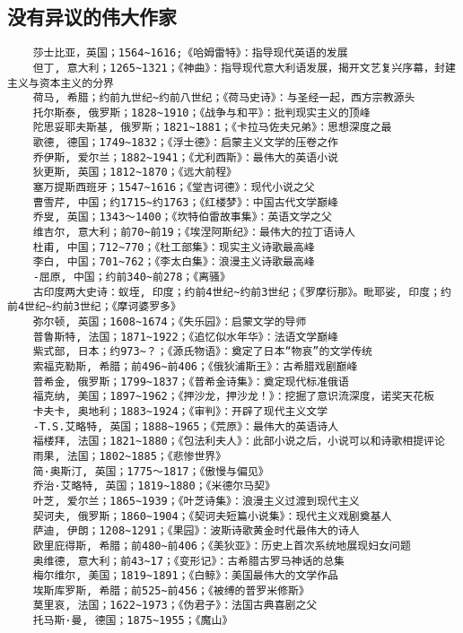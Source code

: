 \documentclass[UTF8]{../RepresentationUniverse}
\begin{document}
\subsection{没有异议的伟大作家}
\begin{lstlisting}
    莎士比亚，英国；1564~1616;《哈姆雷特》：指导现代英语的发展
    但丁, 意大利；1265~1321；《神曲》：指导现代意大利语发展，揭开文艺复兴序幕，封建主义与资本主义的分界
    荷马, 希腊；约前九世纪~约前八世纪；《荷马史诗》：与圣经一起，西方宗教源头
    托尔斯泰, 俄罗斯；1828~1910；《战争与和平》：批判现实主义的顶峰
    陀思妥耶夫斯基, 俄罗斯；1821~1881；《卡拉马佐夫兄弟》：思想深度之最
    歌德, 德国；1749~1832；《浮士德》：启蒙主义文学的压卷之作
    乔伊斯, 爱尔兰；1882~1941；《尤利西斯》：最伟大的英语小说
    狄更斯, 英国；1812~1870；《远大前程》
    塞万提斯西班牙；1547~1616；《堂吉诃德》：现代小说之父
    曹雪芹, 中国；约1715~约1763；《红楼梦》：中国古代文学巅峰
    乔叟, 英国；1343～1400；《坎特伯雷故事集》：英语文学之父
    维吉尔, 意大利；前70~前19；《埃涅阿斯纪》：最伟大的拉丁语诗人
    杜甫, 中国；712~770；《杜工部集》：现实主义诗歌最高峰
    李白, 中国；701~762；《李太白集》：浪漫主义诗歌最高峰
    -屈原, 中国；约前340~前278；《离骚》
    古印度两大史诗：蚁垤, 印度；约前4世纪~约前3世纪；《罗摩衍那》。毗耶娑, 印度；约前4世纪~约前3世纪；《摩诃婆罗多》
    弥尔顿, 英国；1608~1674；《失乐园》：启蒙文学的导师
    普鲁斯特, 法国；1871~1922；《追忆似水年华》：法语文学巅峰
    紫式部, 日本；约973~？；《源氏物语》：奠定了日本“物哀”的文学传统
    索福克勒斯, 希腊；前496~前406；《俄狄浦斯王》：古希腊戏剧巅峰
    普希金, 俄罗斯；1799~1837；《普希金诗集》：奠定现代标准俄语
    福克纳, 美国；1897~1962；《押沙龙，押沙龙！》：挖掘了意识流深度，诺奖天花板
    卡夫卡, 奥地利；1883~1924；《审判》：开辟了现代主义文学
    -T.S.艾略特, 英国；1888~1965；《荒原》：最伟大的英语诗人
    福楼拜, 法国；1821~1880；《包法利夫人》：此部小说之后，小说可以和诗歌相提评论
    雨果, 法国；1802~1885；《悲惨世界》
    简·奥斯汀, 英国；1775～1817；《傲慢与偏见》
    乔治·艾略特, 英国；1819~1880；《米德尔马契》
    叶芝, 爱尔兰；1865~1939；《叶芝诗集》：浪漫主义过渡到现代主义
    契诃夫, 俄罗斯；1860~1904；《契诃夫短篇小说集》：现代主义戏剧奠基人
    萨迪, 伊朗；1208~1291；《果园》：波斯诗歌黄金时代最伟大的诗人
    欧里庇得斯, 希腊；前480~前406；《美狄亚》：历史上首次系统地展现妇女问题
    奥维德, 意大利；前43~17；《变形记》：古希腊古罗马神话的总集
    梅尔维尔, 美国；1819~1891；《白鲸》：美国最伟大的文学作品
    埃斯库罗斯, 希腊；前525~前456；《被缚的普罗米修斯》
    莫里哀, 法国；1622~1973；《伪君子》：法国古典喜剧之父
    托马斯·曼, 德国；1875~1955；《魔山》

\end{lstlisting}
\end{document}
